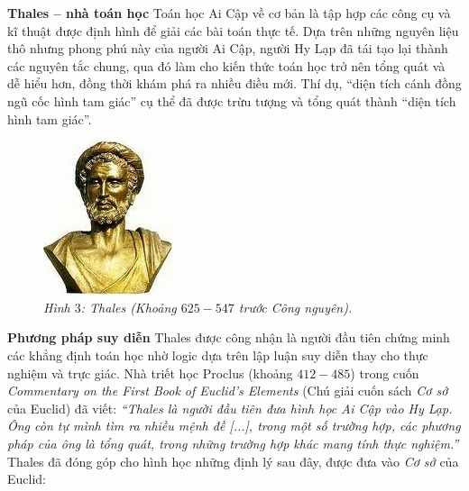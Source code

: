 \begin{multicols}{2}
	\vskip 0.1cm
	\textbf{Thales -- nhà toán học} 
	\vskip 0.1cm
	Toán học Ai Cập về cơ bản là tập hợp các công cụ và kĩ thuật được định hình để giải các bài toán thực tế. Dựa trên những nguyên liệu thô nhưng phong phú này của người Ai Cập, người Hy Lạp đã tái tạo lại thành các nguyên tắc chung, qua đó làm cho kiến thức toán học trở nên tổng quát và dễ hiểu hơn, đồng thời khám phá ra nhiều điều mới. Thí dụ, “diện tích cánh đồng ngũ cốc hình tam giác” cụ thể đã được trừu tượng và tổng quát thành “diện tích hình tam giác”.
		\begin{figure}[H]
		\centering
		\vspace*{-5pt}
		\captionsetup{labelformat= empty, justification=centering}
		\includegraphics[width=0.65\linewidth]{3}
		\caption{\small\textit{\color{lichsutoanhoc}Hình $3$:  Thales (Khoảng $625 - 547$ trước Công nguyên).}}
		\vspace*{-10pt}
	\end{figure}
	\textbf{Phương pháp suy diễn}
	\vskip 0.1cm
	Thales được công nhận là người đầu tiên chứng minh các khẳng định toán học nhờ logic dựa trên lập luận suy diễn thay cho thực nghiệm và trực giác. Nhà triết học Proclus (khoảng $412 - 485$) trong cuốn \textit{Commentary on the First Book of Euclid’s Elements}  (Chú giải cuốn sách \textit{Cơ sở}  của Euclid) đã viết: \textit{“Thales là người đầu tiên  đưa hình học Ai Cập vào Hy Lạp. Ông còn tự mình tìm ra nhiều mệnh đề [...], trong một số trường hợp, các phương pháp của ông là tổng quát, trong những trường hợp khác mang tính thực nghiệm.”}
	Thales đã đóng góp cho hình học những định lý sau đây, được đưa vào \textit{Cơ sở} của Euclid:

\end{multicols}
